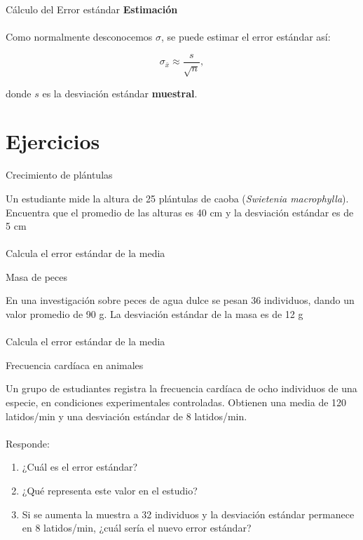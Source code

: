 \documentclass[11pt, aspectratio=169]{beamer}
\begin{document}
\begin{frame}
{Cálculo del Error estándar}{}
 \centering \large
  \textbf{\large Estimación}\\~\\

  Como normalmente desconocemos $ \sigma $, se puede estimar el error
  estándar así:

  $$ \sigma_{\bar{x}} \approx \dfrac{s}{\sqrt{n}}, $$

  donde $ s $ es la desviación estándar \textbf{muestral}.
\end{frame}

\section{Ejercicios}

\begin{frame}
{Crecimiento de plántulas}{}
 \centering \large

 Un estudiante mide la altura de 25 plántulas de caoba (\textit{Swietenia
 macrophylla}). Encuentra que el promedio de las alturas es 40 cm y la
 desviación estándar es de 5 cm\\~\\

 Calcula el error estándar de la media
\end{frame}

\begin{frame}
{Masa de peces}{}
 \centering \large

 En una investigación sobre peces de agua dulce se pesan 36 individuos,
 dando un valor promedio de 90 g. La desviación estándar de la masa es de 12
 g\\~\\

 Calcula el error estándar de la media
\end{frame}

\begin{frame}
{Frecuencia cardíaca en animales}{}
 \centering \large

 Un grupo de estudiantes registra la frecuencia cardíaca de ocho individuos
 de una especie, en condiciones experimentales controladas. Obtienen una
 media de 120 latidos/min y una desviación estándar de 8 latidos/min.\\~\\

 Responde:

 \begin{enumerate}

 \item ¿Cuál es el error estándar?

 \item ¿Qué representa este valor en el estudio?

 \item Si se aumenta la muestra a 32 individuos y la desviación estándar
 permanece en 8 latidos/min, ¿cuál sería el nuevo error estándar?
 \end{enumerate}

\end{frame}
\end{document}
